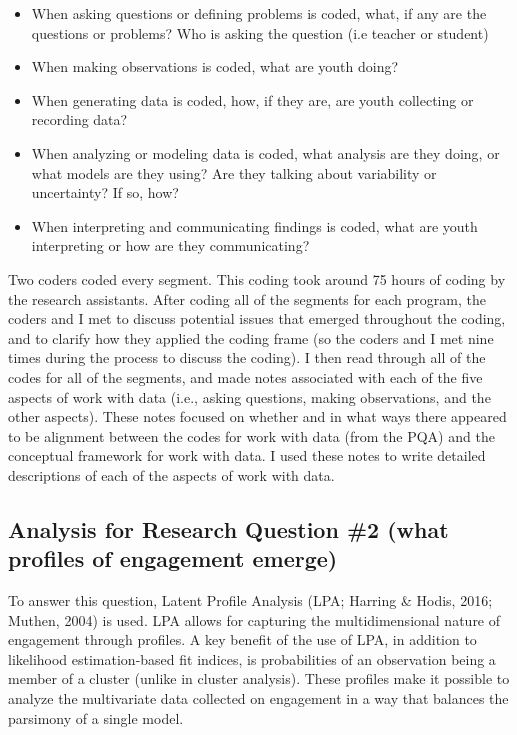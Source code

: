 \documentclass[]{book}
\providecommand{\tightlist}{%
  \setlength{\itemsep}{0pt}\setlength{\parskip}{0pt}}
\theoremstyle{definition}
\theoremstyle{definition}
\theoremstyle{definition}
\theoremstyle{remark}
\begin{document}
\begin{itemize}
\tightlist
\item
  When asking questions or defining problems is coded, what, if any are
  the questions or problems? Who is asking the question (i.e teacher or
  student)
\item
  When making observations is coded, what are youth doing?
\item
  When generating data is coded, how, if they are, are youth collecting
  or recording data?
\item
  When analyzing or modeling data is coded, what analysis are they
  doing, or what models are they using? Are they talking about
  variability or uncertainty? If so, how?
\item
  When interpreting and communicating findings is coded, what are youth
  interpreting or how are they communicating?
\end{itemize}

Two coders coded every segment. This coding took around 75 hours of
coding by the research assistants. After coding all of the segments for
each program, the coders and I met to discuss potential issues that
emerged throughout the coding, and to clarify how they applied the
coding frame (so the coders and I met nine times during the process to
discuss the coding). I then read through all of the codes for all of the
segments, and made notes associated with each of the five aspects of
work with data (i.e., asking questions, making observations, and the
other aspects). These notes focused on whether and in what ways there
appeared to be alignment between the codes for work with data (from the
PQA) and the conceptual framework for work with data. I used these notes
to write detailed descriptions of each of the aspects of work with data.

\subsection{Analysis for Research Question \#2 (what profiles of
engagement
emerge)}\label{analysis-for-research-question-2-what-profiles-of-engagement-emerge}

To answer this question, Latent Profile Analysis (LPA; Harring \& Hodis,
2016; Muthen, 2004) is used. LPA allows for capturing the
multidimensional nature of engagement through profiles. A key benefit of
the use of LPA, in addition to likelihood estimation-based fit indices,
is probabilities of an observation being a member of a cluster (unlike
in cluster analysis). These profiles make it possible to analyze the
multivariate data collected on engagement in a way that balances the
parsimony of a single model.
\end{document}
